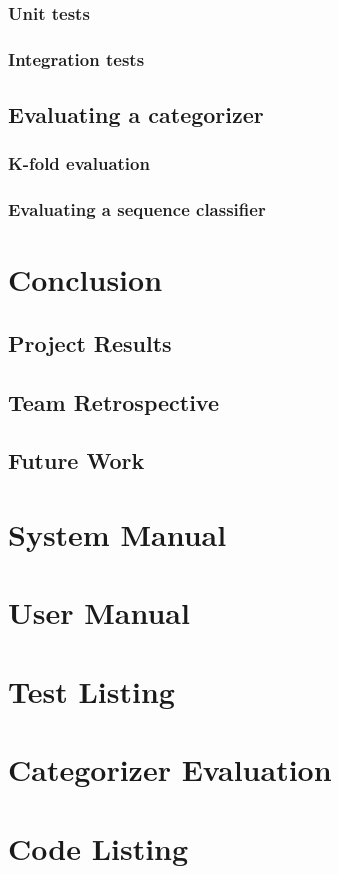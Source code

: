 \documentclass[12pt, twoside, a4paper, draft]{report}
\begin{document}
\subsection{Unit tests}
\subsection{Integration tests}
\section{Evaluating a categorizer}
\subsection{K-fold evaluation}
\subsection{Evaluating a sequence classifier}

\chapter{Conclusion}
\section{Project Results}
\section{Team Retrospective}
\section{Future Work}

\appendix
\chapter{System Manual}
\chapter{User Manual}
\chapter{Test Listing}
\chapter{Categorizer Evaluation}
\chapter{Code Listing}
\end{document}
